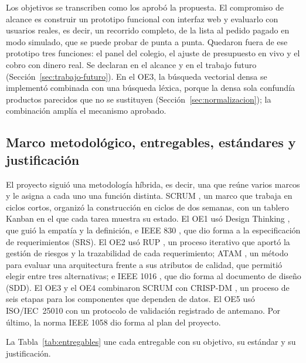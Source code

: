 Los objetivos se transcriben como los aprobó la propuesta. El compromiso de alcance es
construir un prototipo funcional con interfaz web y evaluarlo con usuarios reales, es decir, un recorrido completo, de
la lista al pedido pagado en modo simulado, que se puede probar de punta a punta. Quedaron fuera de ese
prototipo tres funciones: el panel del colegio, el ajuste de presupuesto en vivo y el cobro con dinero real.
Se declaran en el alcance y en el trabajo futuro (Sección~\ref{sec:trabajo-futuro}). En el OE3, la
búsqueda vectorial densa se implementó combinada con una búsqueda léxica, porque la densa sola confundía
productos parecidos que no se sustituyen (Sección~\ref{sec:normalizacion}); la combinación amplía el
mecanismo aprobado.

\subsection{Marco metodológico, entregables, estándares y justificación}

El proyecto siguió una metodología híbrida, es decir, una que reúne varios marcos y le asigna a cada uno una
función distinta. SCRUM \citep{schwaber_scrum_2020}, un marco que trabaja en ciclos cortos, organizó la
construcción en ciclos de dos semanas, con un tablero Kanban en el que cada tarea muestra su estado. El OE1 usó Design Thinking \citep{brown_design_2008}, que guió la empatía y la
definición, e IEEE 830 \citep{ieee_830_1998},
que dio forma a la especificación de requerimientos (SRS). El OE2 usó RUP \citep{kruchten_rup_2003}, un proceso
iterativo que aportó la gestión de riesgos y la trazabilidad de cada requerimiento; ATAM
\citep{bass_software_2021}, un método para evaluar una arquitectura frente a sus atributos de calidad, que
permitió elegir entre tres alternativas; e IEEE 1016 \citep{ieee_1016_2009}, que dio forma al
documento de diseño (SDD). El OE3 y el OE4 combinaron SCRUM con CRISP-DM
\citep{chapman_crisp-dm_2000,wirth_crisp-dm_2000}, un proceso de seis etapas para los componentes que dependen
de datos. El OE5 usó ISO/IEC~25010 \citep{iso_25010_2011} con un protocolo de validación registrado de
antemano. Por último, la norma IEEE 1058 \citep{ieee_1058_1998} dio forma al plan del proyecto.\par

La Tabla~\ref{tab:entregables} une cada entregable con su objetivo, su estándar y su justificación.

